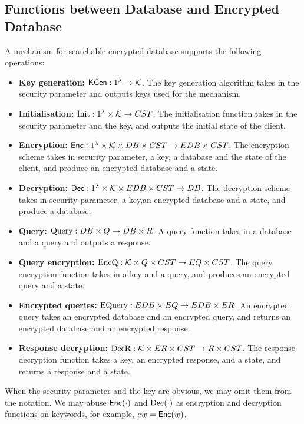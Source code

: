 \subsection{Functions between Database and Encrypted Database}
A mechanism for searchable encrypted database supports the following operations:
\begin{itemize}
	\item \textbf{Key generation:} $\mathsf{KGen}: 1^{\lambda} \rightarrow \mathcal{K}$. The key generation algorithm takes in the security parameter and outputs keys used for the mechanism.
	
	\item \textbf{Initialisation:} $\text{Init}: 1^{\lambda} \times \mathcal{K} \rightarrow CST$. The initialisation function takes in the security parameter and the key, and outputs the initial state of the client.
	
	\item \textbf{Encryption:} $\mathsf{Enc}: 1^{\lambda} \times \mathcal{K} \times DB \times CST \rightarrow EDB \times CST$. The encryption scheme takes in security parameter, a key, a database and the state of the client, and produce an encrypted database and a state.
	
	\item \textbf{Decryption:} $\mathsf{Dec}: 1^{\lambda} \times \mathcal{K} \times EDB \times CST \rightarrow DB$. The decryption scheme takes in security parameter, a key,an encrypted database and a state, and produce a database.
	
	\item \textbf{Query:} $\text{Query}: DB \times Q \rightarrow DB \times R$. A query function takes in a database and a query and outputs a response.
	
	\item \textbf{Query encryption:} $\text{EncQ}: \mathcal{K} \times Q \times CST \rightarrow EQ \times CST$. The query encryption function takes in a key and a query, and produces an encrypted query and a state.
	
	\item \textbf{Encrypted queries:} $\text{EQuery}:EDB \times EQ \rightarrow EDB \times ER$. An encrypted query takes an encrypted database and an encrypted query, and returns an encrypted database and an encrypted response.
	
	\item \textbf{Response decryption:} $\text{DecR}: \mathcal{K} \times ER \times CST \rightarrow R \times CST$. The response decryption function takes a key, an encrypted response, and a state, and returns a response and a state.
\end{itemize}
When the security parameter and the key are obvious, we may omit them from the notation. We may abuse $\mathsf{Enc}(\cdot)$ and $\mathsf{Dec}(\cdot)$ as encryption and decryption functions on keywords, for example, $ew = \mathsf{Enc}(w)$.


